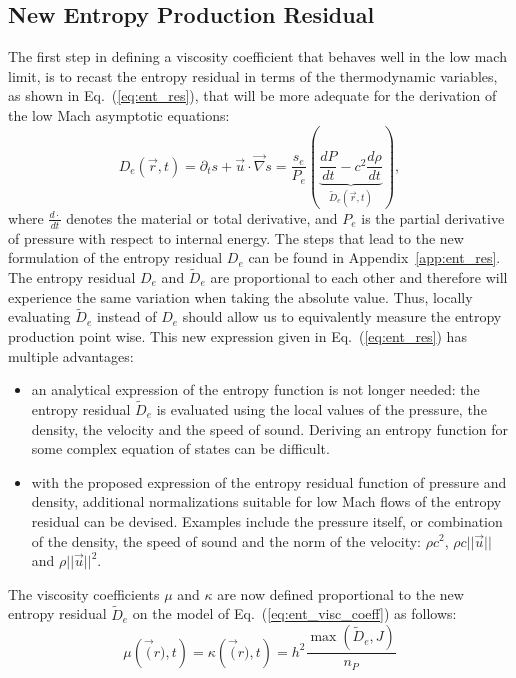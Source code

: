 \documentclass[preprint,10pt]{elsarticle}
\newcommand{\grad}{\vec{\nabla}}
\newcommand{\eqt}[1]{Eq.~(\ref{#1})}                     %
\newcommand{\app}[1]{Appendix~\ref{#1}}                   %
\begin{document}
\subsection{New Entropy Production Residual}\label{sec:new_ent_prod} 
The first step in defining a viscosity coefficient that behaves well in the low mach limit, is to recast the entropy residual in terms of the thermodynamic variables, as shown in \eqt{eq:ent_res}, that will be more adequate for the derivation of the low Mach asymptotic equations:
\begin{equation}
\label{eq:ent_res}
D_e(\vec{r},t) = \partial_t s + \vec{u} \cdot \grad s = \frac{s_e}{P_e} \left( \underbrace{\frac{d P}{dt} - c^2 \frac{d \rho}{dt}}_{\tilde{D}_e(\vec{r},t)} \right),
\end{equation} 
where $\frac{d \cdot}{dt}$ denotes the material or total derivative, and $P_e$ is the partial derivative of pressure with respect to internal energy. The steps that lead to the new formulation of the entropy residual $D_e$ can be found in \app{app:ent_res}. \\
The entropy residual $D_e$ and $\tilde{D}_e$ are proportional to each other and therefore will experience the same variation when taking the absolute value. Thus,  locally evaluating $\tilde{D}_e$ instead of $D_e$ should allow us to equivalently measure the entropy production point wise. This new expression given in \eqt{eq:ent_res} has multiple advantages:
\begin{itemize}
\item an analytical expression of the entropy function is not longer needed: the entropy residual $\tilde{D}_e$ is evaluated using the local values of the pressure, the density, the velocity and the speed of sound. Deriving an entropy function for some complex equation of states can be difficult.
\item with the proposed expression of the entropy residual function of pressure and density, additional normalizations suitable for low Mach flows of the entropy residual can be devised. Examples include the pressure itself, or combination of the density, the speed of sound and the norm of the velocity: $\rho c^2$, $\rho c || \vec{u} ||$ and $\rho || \vec{u} ||^2$. 
\end{itemize}
The viscosity coefficients $\mu$ and $\kappa$ are now defined proportional to the new entropy residual $\tilde{D}_e$ on the model of \eqt{eq:ent_visc_coeff} as follows:
\begin{equation}\label{eq:visc_definition}
\mu \left( \vec(r),t \right) = \kappa \left( \vec(r),t \right) = h^2 \frac{\max \left( \tilde{D}_e, J \right)}{n_P}
\end{equation}
\end{document}
